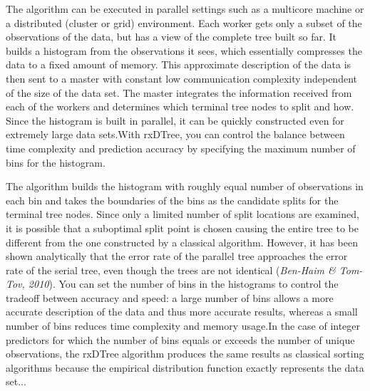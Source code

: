 \documentclass[RevoRtalk.tex]{subfiles}
\begin{document}
The algorithm can be executed in parallel settings such as a multicore machine or a distributed (cluster or grid) environment. Each worker gets only a subset of the observations of the data, but has a view of the complete tree built so far. It builds a histogram from the observations it sees, which essentially compresses the data to a fixed amount of memory. This approximate description of the data is then sent to a master with constant low communication complexity independent of the size of the data set. The master integrates the information received from each of the workers and determines which terminal tree nodes to split and how. Since the histogram is built in parallel, it can be quickly constructed even for extremely large data sets.With rxDTree, you can control the balance between time complexity and prediction accuracy by specifying the maximum number of bins for the histogram. 


The algorithm builds the histogram with roughly equal number of observations in each bin and takes the boundaries of the bins as the candidate splits for the terminal tree nodes. Since only a limited number of split locations are examined, it is possible that a suboptimal split point is chosen causing the entire tree to be different from the one constructed by a classical algorithm. However, it has been shown analytically that the error rate of the parallel tree approaches the error rate of the serial tree, even though the trees are not identical (\textit{Ben-Haim \& Tom-Tov, 2010}). You can set the number of bins in the histograms to control the tradeoff between accuracy and speed: a large number of bins allows a more accurate description of the data and thus more accurate results, whereas a small number of bins reduces time complexity and memory usage.In the case of integer predictors for which the number of bins equals or exceeds the number of unique observations, the rxDTree algorithm produces the same results as classical  sorting 
algorithms because the empirical distribution function exactly represents the data set...
\end{document}
